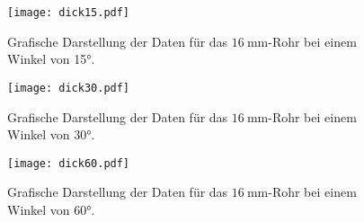 \begin{figure}
  \centering
  \texttt{[image: dick15.pdf]}
  \caption{Grafische Darstellung der Daten für das $\SI{16}{\milli\metre}$-Rohr bei einem Winkel von 15°.}
  \label{fig:dick15}
\end{figure}
\begin{figure}
  \centering
  \texttt{[image: dick30.pdf]}
  \caption{Grafische Darstellung der Daten für das $\SI{16}{\milli\metre}$-Rohr bei einem Winkel von 30°.}
  \label{fig:dick30}
\end{figure}
\begin{figure}
  \centering
  \texttt{[image: dick60.pdf]}
  \caption{Grafische Darstellung der Daten für das $\SI{16}{\milli\metre}$-Rohr bei einem Winkel von 60°.}
  \label{fig:dick60}
\end{figure}
